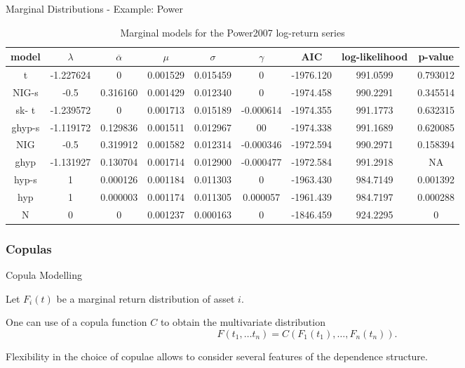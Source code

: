 {Marginal Distributions - Example: Power}

{\tiny

\begin{table}[ht]
            \vspace{0.5cm}
                \begin{tabular}{c|c|c|c|c|c|c|c|c}
                    model&$\lambda$&$\overline{\alpha}$&$\mu$&$\sigma$&$\gamma$&AIC&log-likelihood&p-value\\\hline
                    t&-1.227624&0&0.001529&0.015459&0&-1976.120&991.0599&0.793012\\
                    NIG-s&-0.5&0.316160&0.001429&0.012340&0&-1974.458&990.2291&0.345514\\
                    sk- t&-1.239572&0&0.001713&0.015189&-0.000614&-1974.355&991.1773&0.632315\\
                    ghyp-s&-1.119172&0.129836&0.001511&0.012967&00&-1974.338&991.1689&0.620085\\
                    NIG&-0.5&0.319912&0.001582&0.012314&-0.000346&-1972.594&990.2971&0.158394\\
                    ghyp&-1.131927&0.130704&0.001714&0.012900&-0.000477&-1972.584&991.2918&NA\\
                    hyp-s&1&0.000126&0.001184&0.011303&0&-1963.430&984.7149&0.001392\\
                    hyp&1&0.000003&0.001174&0.011305&0.000057&-1961.439&984.7197&0.000288\\
                    N &0&0&0.001237&0.000163&0&-1846.459&924.2295&0
                \end{tabular}
                \caption{Marginal models for the Power2007 log-return series}
        \end{table}
}

\subsubsection{Copulas}

{Copula Modelling}

Let $F_i(t)$ be a marginal return distribution
of asset $i$.

One can use of a copula function $C$ to obtain the multivariate
 distribution
$$
F(t_1, \ldots t_n)=C(F_1(t_1),\ldots,F_n(t_n)).
$$

Flexibility in the choice of copulae allows to consider several
features of the dependence
structure.

